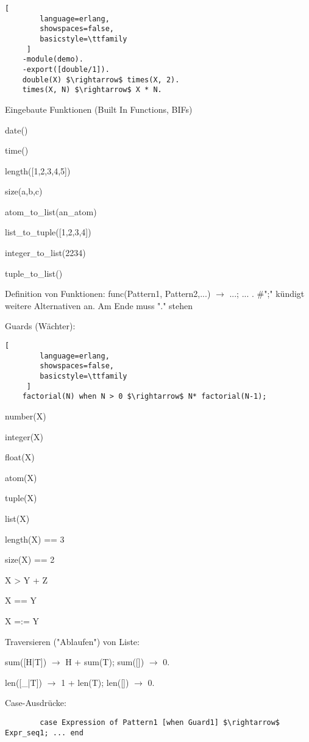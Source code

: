 \documentclass[10pt]{article}
\begin{document}
\begin{itemize*}
\begin{lstlisting}[
        language=erlang,
        showspaces=false,
        basicstyle=\ttfamily
     ]
    -module(demo).
    -export([double/1]).
    double(X) $\rightarrow$ times(X, 2).
    times(X, N) $\rightarrow$ X * N.
    \end{lstlisting}
  \item Eingebaute Funktionen (Built In Functions, BIFs)
  \begin{itemize*}
    \item date()
    \item time()
    \item length([1,2,3,4,5])
    \item size({a,b,c})
    \item atom\_to\_list(an\_atom)
    \item list\_to\_tuple([1,2,3,4])
    \item integer\_to\_list(2234)
    \item tuple\_to\_list({})
  \end{itemize*}
  \item Definition von Funktionen: func(Pattern1, Pattern2,...) $\rightarrow$ ...; ... . \#";" kündigt weitere Alternativen an. Am Ende muss "." stehen
  \item Guards (Wächter):
  \begin{lstlisting}[
        language=erlang,
        showspaces=false,
        basicstyle=\ttfamily
     ]
    factorial(N) when N > 0 $\rightarrow$ N* factorial(N-1);
    \end{lstlisting}
  \begin{itemize*}
    \item number(X)   %
    \item integer(X)  %
    \item float(X)    %
    \item atom(X)     %
    \item tuple(X)    %
    \item list(X)     %
    \item length(X) == 3  %
    \item size(X) == 2    %
    \item X > Y + Z   %
    \item X == Y  %
    \item X =:= Y %
  \end{itemize*}
  \item Traversieren ("Ablaufen") von Liste:
  \begin{itemize*}
    \item sum([H|T]) $\rightarrow$ H + sum(T); sum([]) $\rightarrow$ 0.
    \item len([\_|T]) $\rightarrow$ 1 + len(T); len([]) $\rightarrow$ 0.
  \end{itemize*}
  \item Case-Ausdrücke:
  \begin{lstlisting} 
        case Expression of Pattern1 [when Guard1] $\rightarrow$ Expr_seq1; ... end 
    \end{lstlisting}
\end{itemize*}
\end{document}
